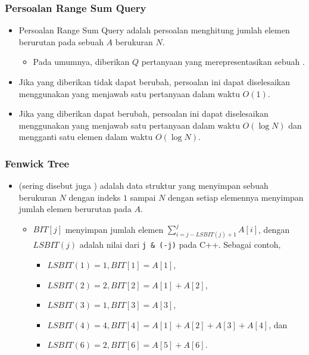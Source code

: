 \begin{frame}
\frametitle{Persoalan Range Sum Query}
\begin{itemize}
  \item Persoalan Range Sum Query adalah persoalan menghitung jumlah elemen berurutan pada sebuah \farray $A$ berukuran $N$.
  \begin{itemize}
    \item Pada umumnya, diberikan $Q$ pertanyaan yang merepresentasikan sebuah \fsubarray.
  \end{itemize}
  \item Jika \farray yang diberikan tidak dapat berubah, persoalan ini dapat diselesaikan menggunakan \fprefixSum yang menjawab satu pertanyaan dalam waktu $O(1)$.
  \item Jika \farray yang diberikan dapat berubah, persoalan ini dapat diselesaikan menggunakan \ffenwickTree yang menjawab satu pertanyaan dalam waktu $O(\log N)$ dan mengganti satu elemen \farray dalam waktu $O(\log N)$.
\end{itemize}
\end{frame}

\begin{frame}
\frametitle{Fenwick Tree}
\begin{itemize}
  \item {} (sering disebut juga ) adalah data struktur yang menyimpan sebuah \farray berukuran $N$ dengan indeks $1$ sampai $N$ dengan setiap elemennya menyimpan jumlah elemen berurutan pada \farray $A$.
  \begin{itemize}
    \item $BIT[j]$ menyimpan jumlah elemen $\sum_{i=j - LSBIT(j) + 1}^{j} A[i]$, dengan $LSBIT(j)$ adalah nilai dari \lstinline{j & (-j)} pada C++. Sebagai contoh,
    \begin{itemize}
      \item $LSBIT(1) = 1, BIT[1] = A[1]$,
      \item $LSBIT(2) = 2, BIT[2] = A[1] + A[2]$,
      \item $LSBIT(3) = 1, BIT[3] = A[3]$,
      \item $LSBIT(4) = 4, BIT[4] = A[1] + A[2] + A[3] + A[4]$, dan
      \item $LSBIT(6) = 2, BIT[6] = A[5] + A[6]$.
    \end{itemize}
  \end{itemize}
\end{itemize}
\end{frame}

